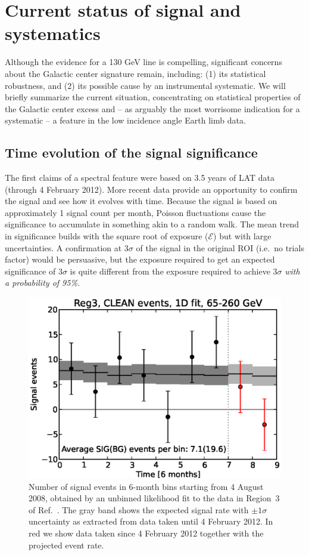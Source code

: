 \documentclass[aps,prd,superscriptaddress,nofootinbib,fixlfloat, 12pt]{revtex4-1}
\begin{document}
\section{Current status of signal and systematics}
Although the evidence for a 130 GeV line is compelling, significant concerns
about the Galactic center signature remain, including: (1) its statistical
robustness, and (2) its possible cause by an instrumental systematic. We will
briefly summarize the current situation, concentrating on statistical
properties of the Galactic center excess and -- as arguably the most worrisome
indication for a systematic -- a feature in the low incidence angle Earth
limb data.

\subsection{Time evolution of the signal significance}
The first claims of a spectral feature \citep{Bringmann:2012,Weniger:2012}
were based on 3.5 years of LAT data (through 4 February 2012).  More recent data provide an opportunity to confirm the signal and see how it evolves with
time.  Because the signal is based on approximately 1 signal count per month,
Poisson fluctuations cause the significance to accumulate in
something akin to a random walk.  The mean trend in significance builds with
the square root of exposure ($\mathcal{E}$) but with large uncertainties.  A confirmation at $3\sigma$ of the
signal in the original ROI (i.e.~no trials factor) would be persuasive, but
the exposure required to get an expected significance of $3\sigma$ is quite
different from the exposure required to achieve $3\sigma$ \emph{with a
probability of 95\%.}

\begin{figure}[h]
  \begin{center}
    \includegraphics[width=0.60\linewidth]{plots/semester_fluxes.eps}
    \vspace{-0.5cm}
  \end{center}
  \caption{Number of signal events in 6-month bins starting from 4
    August 2008, obtained by an unbinned likelihood fit to the data in
    Region~3 of Ref.~\cite{Weniger:2012}. The gray band shows the expected
    signal rate with $\pm1\sigma$ uncertainty as extracted from data taken until
    4 February 2012.
    In red we show data taken since 4 February 2012
    together with the projected event rate.}
  \label{fig:semester_fluxes}
\end{figure}
\end{document}

